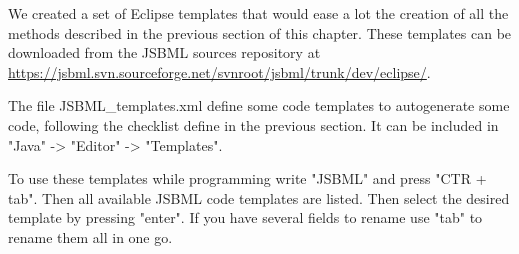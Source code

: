 We created a set of Eclipse templates that would ease a lot the creation of all 
the methods described in the previous section of this chapter. These templates
can be downloaded from the JSBML sources repository at 
\url{https://jsbml.svn.sourceforge.net/svnroot/jsbml/trunk/dev/eclipse/}.

The file JSBML\_templates.xml define some code templates to autogenerate some code, following the
checklist define in the previous section.
It can be included in "Java" -> "Editor" -> "Templates".

To use these templates while programming write "JSBML" and press "CTR + tab". Then all 
available JSBML code templates are listed. Then select the desired template by pressing 
"enter". If you have several fields to rename use "tab" to rename them all in one go.
